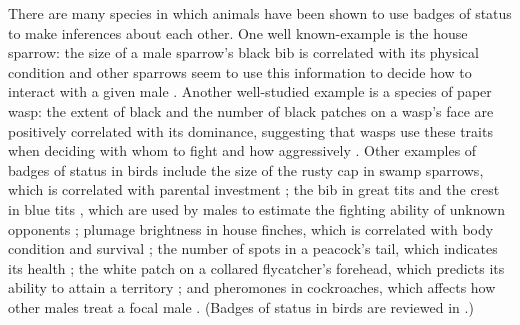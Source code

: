 There are many species in which animals have been shown to use badges of status to make inferences about each other. One well known-example is the house sparrow: the size of a male sparrow's black bib is correlated with its physical condition and other sparrows seem to use this information to decide how to interact with a given male \citep{Moller:1987vn,Veiga:1993fk}. Another well-studied example is a species of paper wasp: the extent of black and the number of black patches on a wasp's face are positively correlated with its dominance, suggesting that wasps use these traits when deciding with whom to fight and how aggressively \citep{Tibbetts:2004kx,Tibbetts:2007zr}. Other examples of badges of status in birds include the size of the rusty cap in swamp sparrows, which is correlated with parental investment \citep{Olsen:2010uq}; the bib in great tits \citep{Lemel:1993ve} and the crest in blue tits \citep{Remy:2010fk}, which are used by males to estimate the fighting ability of unknown opponents \citep{Lemel:1993ve}; plumage brightness in house finches, which is correlated with body condition and survival \citep{McGraw:2000qf}; the number of spots in a peacock's tail, which indicates its health \citep{Loyau:2005nx}; the white patch on a collared flycatcher's forehead, which predicts its ability to attain a territory \citep{Part:1997ys}; and pheromones in cockroaches, which affects how other males treat a focal male \citep{Moore:1997kx}. (Badges of status in birds are reviewed in \citep{Jawor:2003bh,Senar:2006dq,Santos:2011ly,Young:2015dq}.) 


